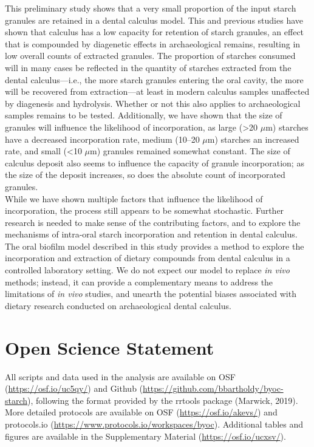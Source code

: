 \documentclass[utf8]{../templates/frontiersSCNS}
\begin{document}
This preliminary study shows that a very small proportion of the input starch
granules are retained in a dental calculus model. This and previous studies
have shown that calculus has a low capacity for retention of starch granules,
an effect that is compounded by diagenetic effects in archaeological remains,
resulting in low overall counts of extracted granules.
The proportion of starches consumed will in many cases be reflected
in the quantity
of starches extracted from the dental calculus---i.e., the more starch granules
entering the oral cavity, the more will be recovered from extraction---at
least in modern calculus samples unaffected by diagenesis and hydrolysis.
Whether or not this also applies to archaeological samples remains to be tested.
Additionally, we have
shown that the size of granules will influence the likelihood of incorporation,
as large (\textgreater20 \(\mu\)m) starches have a decreased incorporation rate, medium
(10--20 \(\mu\)m)
starches an increased rate, and small (\textless10 \(\mu\)m) granules remained somewhat
constant. The size of calculus deposit also seems to influence the capacity of
granule incorporation; as the size of the deposit increases, so does the
absolute count of incorporated granules.\\
While we have shown multiple factors that influence the likelihood
of incorporation, the process still appears to be somewhat stochastic. Further
research is needed to make sense of the contributing factors, and to explore the
mechanisms of intra-oral starch incorporation and retention in dental calculus.
The oral biofilm model described in this study provides a method
to explore the incorporation and extraction of dietary compounds from dental calculus
in a controlled laboratory setting. We do not expect our model to replace \emph{in vivo}
methods; instead, it can provide a complementary means to address the limitations
of \emph{in vivo} studies, and unearth the potential biases associated
with dietary research conducted on archaeological dental calculus.

\hypertarget{open-science-statement}{%
\section*{Open Science Statement}\label{open-science-statement}}

All scripts and data used in the analysis are available on OSF
(\url{https://osf.io/uc5qy/}) and Github (\url{https://github.com/bbartholdy/byoc-starch}),
following the format provided by the rrtools package (Marwick, 2019).
More detailed protocols are available on OSF (\url{https://osf.io/akevs/})
and protocols.io (\url{https://www.protocols.io/workspaces/byoc}).
Additional tables and figures are available in the Supplementary Material
(\url{https://osf.io/ucxsv/}).
\end{document}
